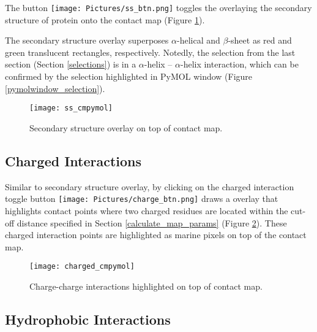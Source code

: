 \documentclass[11pt,fleqn]{book} %
\begin{document}
The button \texttt{[image: Pictures/ss\_btn.png]} toggles the overlaying the secondary structure of protein onto the contact map (Figure \ref{ssoverlay}).

The secondary structure overlay superposes $\alpha$-helical and $\beta$-sheet as {\color{red} red} and {\color{green} green} translucent rectangles, respectively. Notedly, the selection from the last section (Section \ref{selections}) is in a $\alpha$-helix -- $\alpha$-helix interaction, which can be confirmed by the selection highlighted in PyMOL window (Figure \ref{pymolwindow_selection}).

\begin{figure}[ht!]
\centering
  \begin{minipage}{\textwidth}
  \centering
      \texttt{[image: ss\_cmpymol]}
      \caption{Secondary structure overlay on top of contact map.}
  \label{ssoverlay}
  \end{minipage}
\end{figure}

\subsection{Charged Interactions}

Similar to secondary structure overlay, by clicking on the charged interaction toggle button \texttt{[image: Pictures/charge\_btn.png]} draws a overlay that highlights contact points where two charged residues are located within the cut-off distance specified in Section \ref{calculate_map_params} (Figure \ref{chargedoverlay}). These charged interaction points are highlighted as {\color{marine} marine} pixels on top of the contact map.

\begin{figure}[ht!]
\centering
  \begin{minipage}{\textwidth}
  \centering
      \texttt{[image: charged\_cmpymol]}
      \caption{Charge-charge interactions highlighted on top of contact map.}
  \label{chargedoverlay}
  \end{minipage}
\end{figure}

\subsection{Hydrophobic Interactions}
\end{document}

